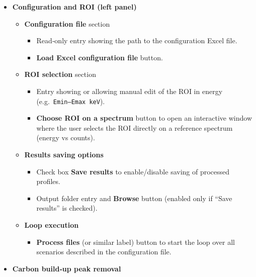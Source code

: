 \begin{itemize}
\item
  \textbf{Configuration and ROI (left panel)}

  \begin{itemize}
  \tightlist
  \item
    \textbf{Configuration file} section

    \begin{itemize}
    \tightlist
    \item
      Read‑only entry showing the path to the configuration Excel
      file.\\
    \item
      \textbf{Load Excel configuration file} button.
    \end{itemize}
  \item
    \textbf{ROI selection} section

    \begin{itemize}
    \tightlist
    \item
      Entry showing or allowing manual edit of the ROI in energy
      (e.g.~\texttt{Emin–Emax\ keV}).\\
    \item
      \textbf{Choose ROI on a spectrum} button to open an interactive
      window where the user selects the ROI directly on a reference
      spectrum (energy vs counts).
    \end{itemize}
  \item
    \textbf{Results saving options}

    \begin{itemize}
    \tightlist
    \item
      Check box \textbf{Save results} to enable/disable saving of
      processed profiles.\\
    \item
      Output folder entry and \textbf{Browse} button (enabled only if
      ``Save results'' is checked).
    \end{itemize}
  \item
    \textbf{Loop execution}

    \begin{itemize}
    \tightlist
    \item
      \textbf{Process files} (or similar label) button to start the loop
      over all scenarios described in the configuration file.
    \end{itemize}
  \end{itemize}
\item
  \textbf{Carbon build‑up peak removal}


\end{itemize}
